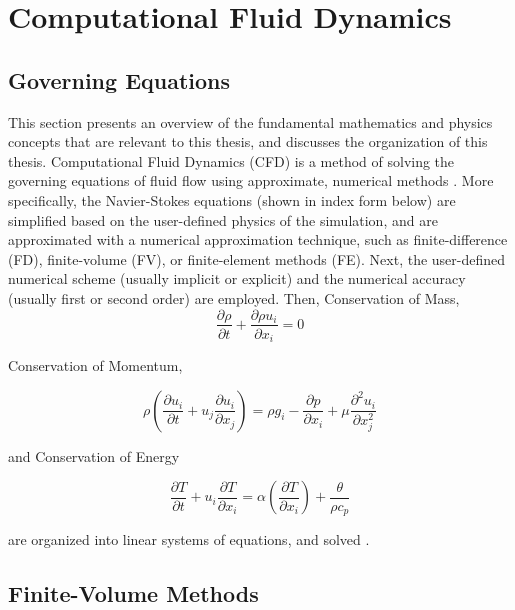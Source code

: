 \documentclass{UCF_ETD}
\begin{document}
\section{Computational Fluid Dynamics}
\subsection{Governing Equations}
\label{sec:governingEquations}

This section presents an overview of the fundamental mathematics and physics concepts that are relevant to this thesis, and discusses the organization of this thesis. Computational Fluid Dynamics (CFD) is a method of solving the governing equations of fluid flow using approximate, numerical methods \cite{Anderson1995}. More specifically, the Navier-Stokes equations (shown in index form below) are simplified based on the user-defined physics of the simulation, and are approximated with a numerical approximation technique, such as finite-difference (FD), finite-volume (FV), or finite-element methods (FE). Next, the user-defined numerical scheme (usually implicit or explicit) and the numerical accuracy (usually first or second order) are employed. Then, Conservation of Mass,
\begin{equation}
    \frac{\partial \rho}{\partial t} + \frac{\partial \rho u_{i}}{\partial x_{i}} = 0
    \label{eq:ConsMom}
\end{equation}

Conservation of Momentum, 

\begin{equation}
        \rho\left(\frac{\partial u_i}{\partial t}+u_j\frac{\partial u_i}{\partial x_j}\right)=\rho g_i-\frac{\partial p}{\partial x_i}+\mu\frac{\partial^2u_i}{\partial x_j^2}    
        \label{eq:ConsMass}
\end{equation}

and Conservation of Energy

\begin{equation}
    \frac{\partial T}{\partial t}+u_i\frac{\partial T}{\partial x_i}=\alpha\left(\frac{\partial T}{\partial x_i}\right)+\frac{\theta}{\rho c_p}
    \label{eq:ConsEnergy}
\end{equation}


are organized into linear systems of equations, and solved \cite{Anderson1995}. 

\subsection{Finite-Volume Methods}
\label{sec:FVM}
\end{document}
